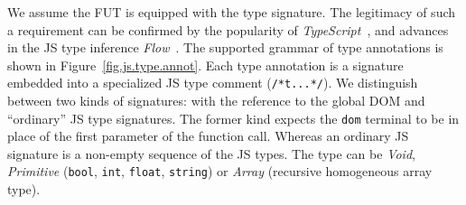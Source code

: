 We assume the FUT is equipped with the type signature. The legitimacy of such a requirement can be confirmed by the popularity of \emph{TypeScript}~\cite{typescript}, and advances in the JS type inference \emph{Flow}~\cite{flow}. The supported grammar of type annotations is shown in Figure~\ref{fig.js.type.annot}. Each type annotation is a signature embedded into a specialized JS type comment (\texttt{/*t...*/}). We distinguish between two kinds of signatures: with the reference to the global DOM and ``ordinary'' JS type signatures. The former kind expects the \texttt{dom} terminal to be in place of the first parameter of the function call. Whereas an ordinary JS signature is a non-empty sequence of the JS types. The type can be \emph{Void}, \emph{Primitive} (\texttt{bool}, \texttt{int}, \texttt{float}, \texttt{string}) or \emph{Array} (recursive homogeneous array type).




